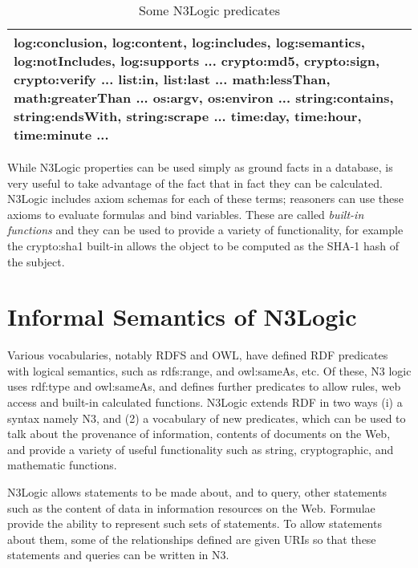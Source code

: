 \documentclass{tlp}
\begin{document}
\begin{table} [h]
\begin{tabular}{p{12cm}}
\hline log:conclusion, log:content, log:includes, log:semantics,
log:notIncludes, log:supports ... crypto:md5, crypto:sign,
crypto:verify ... list:in, list:last ... math:lessThan,
math:greaterThan ... os:argv, os:environ ... string:contains,
string:endsWith, string:scrape ... time:day, time:hour, time:minute
...\\

\hline
\end{tabular}
\label{n3lv}
\caption{Some N3Logic predicates}
\end{table}

While N3Logic properties can be used simply as ground facts in a
database, is very useful to take advantage of the fact that in fact
they can be calculated. N3Logic includes axiom schemas for each of
these terms; reasoners can use these axioms to evaluate formulas and
bind variables.  These are called {\it built-in functions} and they
can be used to provide a variety of functionality, for example the
crypto:sha1 built-in allows the object to be computed as the SHA-1
hash of the subject.


\section{Informal Semantics of N3Logic}

Various vocabularies, notably RDFS and OWL, have defined RDF
predicates with logical semantics, such as rdfs:range, and owl:sameAs,
etc.  Of these, N3 logic uses rdf:type and owl:sameAs, and defines
further predicates to allow rules, web access and built-in calculated
functions. N3Logic extends RDF in two ways (i) a syntax namely N3, and
(2) a vocabulary of new predicates, which can be used to talk about
the provenance of information, contents of documents on the Web, and
provide a variety of useful functionality such as string,
cryptographic, and mathematic functions.


N3Logic allows statements to be made about, and to query, other
statements such as the content of data in information resources on the
Web. Formulae provide the ability to represent such sets of
statements.  To allow statements about them, some of the relationships
defined are given URIs so that these statements and queries can be
written in N3.
\end{document}

